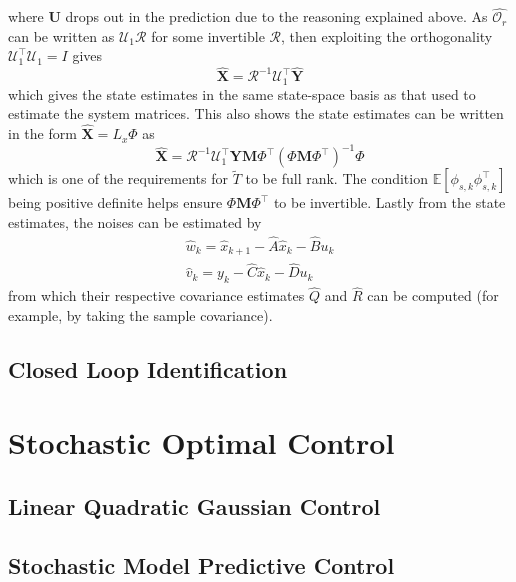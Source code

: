 \documentclass[11pt]{report} %
\begin{document}
where $\mathbf{U}$ drops out in the prediction due to the reasoning explained above. As $\widehat{\mathcal{O}_{r}}$ can be written as $\mathcal{U}_{1}\mathcal{R}$ for some invertible $\mathcal{R}$, then exploiting the orthogonality $\mathcal{U}_{1}^{\top}\mathcal{U}_{1} = I$ gives
\begin{equation}
\widehat{\mathbf{X}} = \mathcal{R}^{-1}\mathcal{U}_{1}^{\top}\widehat{\mathbf{Y}}
\end{equation}
which gives the state estimates in the same state-space basis as that used to estimate the system matrices. This also shows the state estimates can be written in the form $\widehat{\mathbf{X}} = L_{x}\Phi$ as 
\begin{equation}
\widehat{\mathbf{X}} = \mathcal{R}^{-1}\mathcal{U}_{1}^{\top}\mathbf{Y}\mathbf{M}\Phi^{\top}\left(\Phi\mathbf{M}\Phi^{\top}\right)^{-1}\Phi
\end{equation}
which is one of the requirements for $\widetilde{T}$ to be full rank. The condition $\mathbb{E}\left[\phi_{s, k}\phi_{s, k}^{\top}\right]$ being positive definite helps ensure $\Phi\mathbf{M}\Phi^{\top}$ to be invertible. Lastly from the state estimates, the noises can be estimated by
\begin{gather}
\widehat{w}_{k} = \widehat{x}_{k + 1} - \widehat{A}\widehat{x}_{k} - \widehat{B}u_{k} \\
\widehat{v}_{k} = y_{k} - \widehat{C}\widehat{x}_{k} - \widehat{D}u_{k}
\end{gather}
from which their respective covariance estimates $\widehat{Q}$ and $\widehat{R}$ can be computed (for example, by taking the sample covariance).

\subsection{Closed Loop Identification \cite{Kumar1986}}

\section{Stochastic Optimal Control}

\subsection{Linear Quadratic Gaussian Control}

\subsection{Stochastic Model Predictive Control}
\end{document}
